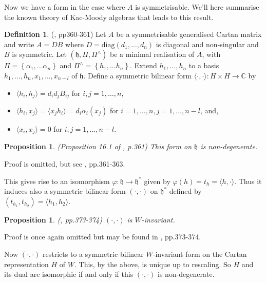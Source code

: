 \documentclass[11pt,a4paper]{report}
\newtheorem{proposition}[theorem]{Proposition}
\theoremstyle{definition}
\newtheorem{definition}[theorem]{Definition}
\begin{document}
 Now we have a form in the case where $A$ is symmetrisable. We'll here summarise the known theory of Kac-Moody algebras that leads to this result. 
 
\begin{definition} (\cite{Carter}, pp360-361) Let $A$ be a symmetrisable generalised Cartan matrix and write $A = DB$ where $D = \text{diag}(d_1, \ldots, d_n)$ is diagonal and non-singular and $B$ is symmetric. Let $(\mathfrak{h}, \Pi, \Pi^\wedge)$ be a minimal realisation of $A$, with $\Pi = \left\{\alpha_1, ... \alpha_n\right\}$ and $\Pi^\wedge = \left\{h_1, ... h_n\right\}$. Extend $h_1, \ldots, h_n$ to a basis $h_1, \ldots, h_n, x_1, \ldots, x_{n-l}$ of $\mathfrak{h}$. Define a symmetric bilinear form $\langle \cdot, \cdot \rangle: H \times H \to \mathbb{C}$ by 
\begin{itemize}
    \item $\langle h_i, h_j \rangle = d_i d_j B_{ij}$ for $i, j = 1, \ldots, n$,
    \item $\langle h_i, x_j \rangle = \langle x_j h_i \rangle = d_i \alpha_i(x_j)$ for $i = 1, \ldots, n, j = 1, \ldots, n -l$, and,
    \item $\langle x_i, x_j \rangle = 0$ for $i, j = 1, \ldots, n -l$. \end{itemize} \end{definition}

 \begin{proposition} (Proposition 16.1 of \cite{Carter}, p.361) This form on $\mathfrak{h}$ is non-degenerate. \end{proposition}

 Proof is omitted, but see \cite{Carter}, pp.361-363.

 This gives rise to an isomorphism $\varphi: \mathfrak{h} \to \mathfrak{h}^*$ given by $\varphi(h) = t_h = \langle h, \cdot \rangle$. Thus it induces also a symmetric bilinear form $(\cdot, \cdot)$ on $\mathfrak{h}^*$ defined by $(t_{h_1}, t_{h_2}) = \langle h_1, h_2 \rangle$.

\begin{proposition} (\cite{Carter}, pp.373-374) $(\cdot, \cdot)$ is $W$-invariant. \end{proposition}

 Proof is once again omitted but may be found in \cite{Carter}, pp.373-374. 

 Now $(\cdot, \cdot)$ restricts to a symmetric bilinear $W$-invariant form on the Cartan representation $H$ of $W$. This, by the above, is unique up to rescaling. So $H$ and its dual are isomorphic if and only if this $(\cdot, \cdot)$ is non-degenerate. 
\end{document}
